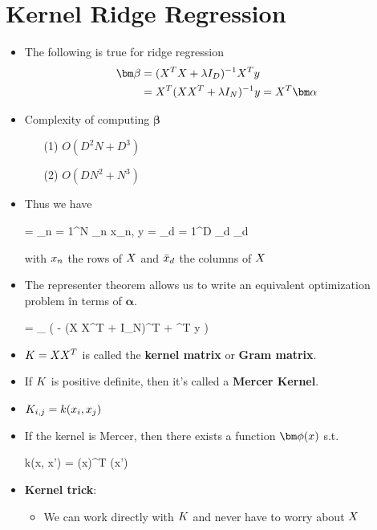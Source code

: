 \section{Kernel Ridge Regression}
\begin{itemize}
	\item The following is true for ridge regression
	\begin{align}
	    \bm \beta &= (\*X^T \*X + \lambda \*I_D)^{-1} \*X^T \*y \\
	    &= \*X^T(\*X\*X^T + \lambda \*I_N)^{-1} \*y = \*X^T \bm \alpha \nonumber
	\end{align}
	\item Complexity of computing $\bm \beta$
	\begin{enumerate}
		\item[(1)] $O(D^2 N + D^3)$
		\item[(2)] $O(D N^2 + N^3)$
	\end{enumerate}
	\item Thus we have
	\begin{myalign*}
	    \bm \beta = \sum_{n = 1}^N \alpha_n \*x_n, \hspace{5pt} \*y = \sum_{d = 1}^D \beta_d _d
	\end{myalign*}
	with $\*x_n$ the rows of $\*X$ and $\*{\bar{x}}_d$ the columns of $\*X$ 
	\item The representer theorem allows us to write an equivalent optimization problem în terms of $\bm \alpha$.
	\begin{myalign*}
	    \bm \alpha = \argmax_{\bm \alpha} 
	    \left(
	    - \bm \alpha (\*X \*X^T + \lambda \*I_N)^T \bm \alpha + \bm \alpha^T \*y 
	    \right)
	\end{myalign*}
	\item $\*K = \*X \*X^T$ is called the \textbf{kernel matrix} or \textbf{Gram matrix}.
	\item If $\*K$ is positive definite, then it's called a \textbf{Mercer Kernel}.
	\item $\*K_{i,j} = k(\*x_i, \*x_j)$
	\item If the kernel is Mercer, then there exists a function $\bm \phi(\*x)$ s.t.
	\begin{myalign*}
	    k(\*x, \*x') = \bm \phi(\*x)^T \bm \phi(\*x')
	\end{myalign*}
	\item \textbf{Kernel trick}: 
	\begin{itemize}
		\item We can work directly with $\*K$ and never have to worry about $\*X$

\end{itemize}
\end{itemize}
